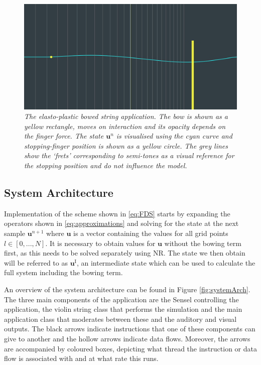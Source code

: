 \documentclass[twoside,a4paper,dvipsnames]{article}
\begin{document}
\begin{figure}[ht]
\centerline{\includegraphics[width=1.0\columnwidth]{JUCEapp.png}}
\caption{\label{fig:application}{\it The elasto-plastic bowed string application. The bow is shown as a yellow rectangle, moves on interaction and its opacity depends on the finger force. The state $\mathbf{u}^n$ is visualised using the cyan curve and stopping-finger position is shown as a yellow circle. The grey lines show the `frets' corresponding to semi-tones as a visual reference for the stopping position and do not influence the model.}}
\end{figure}

\subsection{System Architecture}\label{sec:systemArch}
Implementation of the scheme shown in \eqref{eq:FDS} starts by expanding the operators shown in \eqref{eq:approximations} and solving for the state at the next sample $\mathbf{u}^{n+1}$ where $\mathbf{u}$ is a vector containing the values for all grid points $l\in[0,...,N]$. It is necessary to obtain values for $\mathbf{u}$ without the bowing term first, as this needs to be solved separately using NR. The state we then obtain will be referred to as $\mathbf{u}^\text{I}$, an intermediate state which can be used to calculate the full system including the bowing term.

An overview of the system architecture can be found in Figure \ref{fig:systemArch}. The three main components of the application are the Sensel controlling the application, the violin string class that performs the simulation and the main application class that moderates between these and the auditory and visual outputs. The black arrows indicate instructions that one of these components can give to another and the hollow arrows indicate data flows. Moreover, the arrows are accompanied by coloured boxes, depicting what thread the instruction or data flow is associated with and at what rate this runs. 
\end{document}

